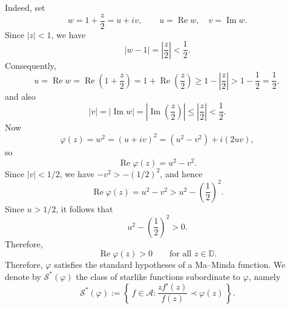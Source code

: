 \documentclass[a4paper,12pt,reqno]{amsart} %
\numberwithin{equation}{section}
\theoremstyle{definition}
\begin{document}
Indeed, set
\[
w=1+\frac{z}{2}=u+iv,
\qquad u=\operatorname{Re}w,\quad v=\operatorname{Im}w.
\]
Since $|z|<1$, we have
\[
|w-1|=\left|\frac{z}{2}\right|<\frac12.
\]
Consequently,
\[
u=\operatorname{Re}w=\operatorname{Re}\!\left(1+\frac{z}{2}\right)
=1+\operatorname{Re}\!\left(\frac{z}{2}\right)
\ge 1-\left|\frac{z}{2}\right|
>1-\frac12=\frac12,
\]
and also
\[
|v|=\left|\operatorname{Im}w\right|
=\left|\operatorname{Im}\!\left(\frac{z}{2}\right)\right|
\le \left|\frac{z}{2}\right|
<\frac12.
\]
Now
\[
\varphi(z)=w^{2}=(u+iv)^{2}=(u^{2}-v^{2})+i(2uv),
\]
so
\[
\operatorname{Re}\varphi(z)=u^{2}-v^{2}.
\]
Since $|v|<1/2$, we have $-v^{2}>-\left(1/2\right)^{2}$, and hence
\[
\operatorname{Re}\varphi(z)=u^{2}-v^{2}
>
u^{2}-\left(\frac12\right)^{2}.
\]
Since $u>1/2$, it follows that
\[
u^{2}-\left(\frac12\right)^{2}>0.
\]
Therefore,
\[
\operatorname{Re}\varphi(z)>0 \qquad \text{for all } z\in\mathbb{D}.
\]
Therefore, $\varphi$ satisfies the standard hypotheses of a Ma--Minda function. We denote by $\mathcal{S}^*(\varphi)$
the class of starlike functions subordinate to $\varphi$, namely
\[
\mathcal{S}^*(\varphi)
:= \left\{\, f \in \mathcal{A} : \frac{z f'(z)}{f(z)} \prec \varphi(z) \,\right\}.
\]
\end{document}
